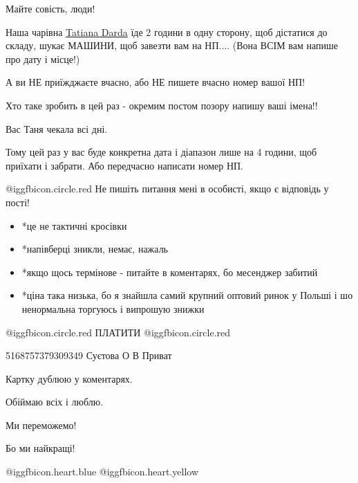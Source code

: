 Майте совість, люди!

Наша чарівна
\href{https://www.facebook.com/profile.php?id=100008205970691}{Tatiana Darda}
їде 2 години в одну сторону, щоб дістатися до складу, шукає МАШИНИ, щоб завезти
вам на НП.... (Вона ВСІМ вам напише про дату і місце!)

А ви НЕ приїжджаєте вчасно, або НЕ пишете вчасно номер вашої НП!

Хто таке зробить в цей раз - окремим постом позору напишу ваші імена!!

Вас Таня чекала всі дні. 

Тому цей раз у вас буде конкретна дата і  діапазон  лише на 4 години, щоб
приїхати і забрати. Або передчасно написати номер НП.

 @igg{fbicon.circle.red}  Не пишіть питання мені в особисті, якщо є відповідь у пості!

\begin{itemize}
  \item *це не тактичні кросівки
  \item *напівберці зникли, немає, нажаль
  \item *якщо щось термінове - питайте в коментарях, бо месенджер забитий
  \item *ціна така низька, бо я знайшла самий крупний оптовий ринок у Польші і шо ненормальна торгуюсь і випрошую знижки
\end{itemize}

 @igg{fbicon.circle.red} ПЛАТИТИ @igg{fbicon.circle.red} 

5168757379309349  Суєтова О В Приват

Картку дублюю у коментарях.

Обіймаю всіх і люблю.

Ми переможемо!

Бо ми найкращі!

 @igg{fbicon.heart.blue}  @igg{fbicon.heart.yellow} 


